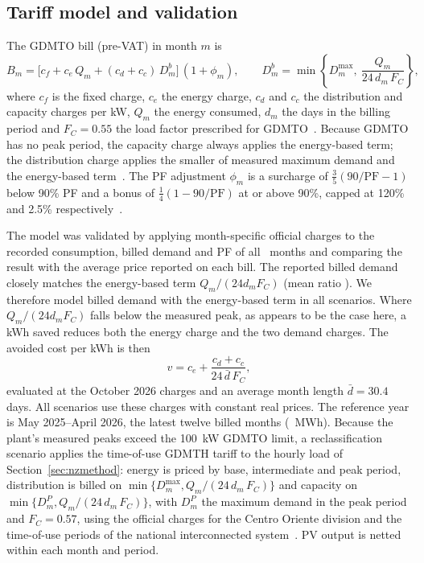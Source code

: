 \documentclass[processes,article,submit,pdftex,moreauthors]{Definitions/mdpi}
\begin{document}
\subsection{Tariff model and validation}
\label{sec:tariffmodel}
The GDMTO bill (pre-VAT) in month $m$ is
\begin{equation}
B_m = \big[c_f + c_e\,Q_m + (c_d + c_c)\,D^{b}_m\big]\,(1+\phi_m), \qquad D^{b}_m = \min\left\{D^{\max}_m,\ \frac{Q_m}{24\,d_m\,F_C}\right\},
\label{eq:bill}
\end{equation}
where $c_f$ is the fixed charge, $c_e$ the energy charge, $c_d$ and $c_c$ the distribution and capacity charges per kW, $Q_m$ the energy consumed, $d_m$ the days in the billing period and $F_C=0.55$ the load factor prescribed for GDMTO~\cite{dof2025tariffs}. Because GDMTO has no peak period, the capacity charge always applies the energy-based term; the distribution charge applies the smaller of measured maximum demand and the energy-based term~\cite{cfe2026gdmto}. The PF adjustment $\phi_m$ is a surcharge of $\tfrac{3}{5}(90/\mathrm{PF}-1)$ below 90\% PF and a bonus of $\tfrac{1}{4}(1-90/\mathrm{PF})$ at or above 90\%, capped at 120\% and 2.5\% respectively~\cite{dof2025tariffs}.

The model was validated by applying month-specific official charges to the recorded consumption, billed demand and PF of all \nNMonths\ months and comparing the result with the average price reported on each bill. The reported billed demand closely matches the energy-based term $Q_m/(24 d_m F_C)$ (mean ratio \nKWRatio). We therefore model billed demand with the energy-based term in all scenarios. Where $Q_m/(24 d_m F_C)$ falls below the measured peak, as appears to be the case here, a kWh saved reduces both the energy charge and the two demand charges. The avoided cost per kWh is then
\begin{equation}
v = c_e + \frac{c_d + c_c}{24\,\bar d\,F_C},
\label{eq:marginal}
\end{equation}
evaluated at the October 2026 charges and an average month length $\bar d = 30.4$ days. All scenarios use these charges with constant real prices. The reference year is May 2025--April 2026, the latest twelve billed months (\nRefMWh~MWh). Because the plant's measured peaks exceed the 100~kW GDMTO limit, a reclassification scenario applies the time-of-use GDMTH tariff to the hourly load of Section~\ref{sec:nzmethod}: energy is priced by base, intermediate and peak period, distribution is billed on $\min\{D^{\max}_m, Q_m/(24\,d_m\,F_C)\}$ and capacity on $\min\{D^{P}_m, Q_m/(24\,d_m\,F_C)\}$, with $D^{P}_m$ the maximum demand in the peak period and $F_C=0.57$, using the official charges for the Centro Oriente division and the time-of-use periods of the national interconnected system~\cite{cfe2026gdmth}. PV output is netted within each month and period.
\end{document}
